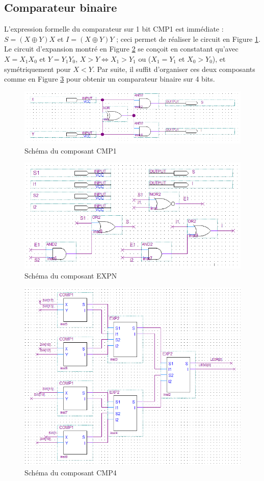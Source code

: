 \documentclass[a4paper,11pt]{article}
\begin{document}
\subsection*{Comparateur binaire}

L'expression formelle du comparateur sur 1 bit CMP1 est immédiate : $S=(X\oplus Y)X$ et $I=(X\oplus Y)Y$ ; ceci permet de réaliser le circuit en Figure \ref{cmp1}. Le circuit d'expansion montré en Figure \ref{expn} se conçoit en constatant qu'avec $X=X_1X_0$ et $Y=Y_1Y_0$, $X>Y\Leftrightarrow X_1>Y_1$ ou ($X_1=Y_1$ et $X_0>Y_0$), et symétriquement pour $X<Y$. Par suite, il suffit d'organiser ces deux composants comme en Figure \ref{cmp4} pour obtenir un comparateur binaire sur 4 bits.

\begin{figure}[h]
\center
\includegraphics[scale=0.6]{cmp1.PNG}
\caption{Schéma du composant CMP1}
\label{cmp1}
\end{figure}

\begin{figure}[h]
\center
\includegraphics[scale=0.6]{exp2.PNG}
\caption{Schéma du composant EXPN}
\label{expn}
\end{figure}

\begin{figure}[h]
\center
\includegraphics[scale=0.6]{cmp4.PNG}
\caption{Schéma du composant CMP4}
\label{cmp4}
\end{figure}
\end{document}
